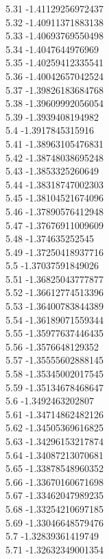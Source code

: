 {5.31	-1.41129256972437\\
5.32	-1.40911371883138\\
5.33	-1.40693769550498\\
5.34	-1.4047644976969\\
5.35	-1.40259412335541\\
5.36	-1.40042657042524\\
5.37	-1.39826183684768\\
5.38	-1.39609992056054\\
5.39	-1.3939408194982\\
5.4	-1.3917845315916\\
5.41	-1.38963105476831\\
5.42	-1.38748038695248\\
5.43	-1.3853325260649\\
5.44	-1.38318747002303\\
5.45	-1.38104521674096\\
5.46	-1.37890576412948\\
5.47	-1.37676911009609\\
5.48	-1.374635252545\\
5.49	-1.37250418937716\\
5.5	-1.37037591849026\\
5.51	-1.36825043777877\\
5.52	-1.36612774513396\\
5.53	-1.36400783844389\\
5.54	-1.36189071559344\\
5.55	-1.35977637446435\\
5.56	-1.3576648129352\\
5.57	-1.35555602888145\\
5.58	-1.35345002017545\\
5.59	-1.35134678468647\\
5.6	-1.3492463202807\\
5.61	-1.34714862482126\\
5.62	-1.34505369616825\\
5.63	-1.34296153217874\\
5.64	-1.34087213070681\\
5.65	-1.33878548960352\\
5.66	-1.33670160671698\\
5.67	-1.33462047989235\\
5.68	-1.33254210697185\\
5.69	-1.33046648579476\\
5.7	-1.32839361419749\\
5.71	-1.32632349001354\\
}
